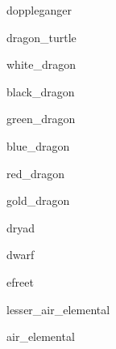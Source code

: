 \documentclass[letterpaper,serif]{module}
\begin{document}
\begin{newmonster}{doppleganger}\end{newmonster}

\begin{newmonster}{dragon_turtle}\end{newmonster}

\begin{newmonster}{white_dragon}\end{newmonster}

\begin{newmonster}{black_dragon}\end{newmonster}

\begin{newmonster}{green_dragon}\end{newmonster}

\begin{newmonster}{blue_dragon}\end{newmonster}

\begin{newmonster}{red_dragon}\end{newmonster}

\begin{newmonster}{gold_dragon}\end{newmonster}

\begin{newmonster}{dryad}\end{newmonster}

\begin{newmonster}{dwarf}\end{newmonster}

\begin{newmonster}{efreet}\end{newmonster}

\begin{newmonster}{lesser_air_elemental}\end{newmonster}

\begin{newmonster}{air_elemental}\end{newmonster}
\end{document}
